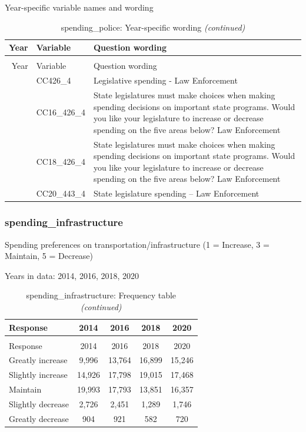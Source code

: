 \documentclass[
  12pt]{article}
\begin{document}
Year-specific variable names and
wording\begingroup\fontsize{11}{13}\selectfont

\begin{longtable}[t]{rl>{\raggedright\arraybackslash}p{10cm}}
\caption{\label{tab:unnamed-chunk-5}spending\_police: Year-specific wording}\\
\toprule
Year & Variable & Question wording\\
\midrule
\endfirsthead
\caption[]{spending\_police: Year-specific wording \textit{(continued)}}\\
\toprule
Year & Variable & Question wording\\
\midrule
\endhead

\endfoot
\bottomrule
\endlastfoot
2014 & CC426\_4 & Legislative spending - Law Enforcement\\
\addlinespace
2016 & CC16\_426\_4 & State legislatures must make choices when making spending decisions on important state programs. Would you like your legislature to increase or decrease spending on the five areas below? Law Enforcement\\
\addlinespace
2018 & CC18\_426\_4 & State legislatures must make choices when making spending decisions on important state programs. Would you like your legislature to increase or decrease spending on the five areas below? Law Enforcement\\
\addlinespace
2020 & CC20\_443\_4 & State legislature spending -- Law Enforcement\\*
\end{longtable}
\endgroup{}

\hypertarget{spending_infrastructure}{%
\subsubsection{spending\_infrastructure}\label{spending_infrastructure}}

Spending preferences on transportation/infrastructure (1 = Increase, 3 =
Maintain, 5 = Decrease)

Years in data: 2014, 2016, 2018,
2020\begingroup\fontsize{10}{12}\selectfont

\begin{longtable}[t]{lcccc}
\caption{\label{tab:unnamed-chunk-5}spending\_infrastructure: Frequency table}\\
\toprule
Response & 2014 & 2016 & 2018 & 2020\\
\midrule
\endfirsthead
\caption[]{spending\_infrastructure: Frequency table \textit{(continued)}}\\
\toprule
Response & 2014 & 2016 & 2018 & 2020\\
\midrule
\endhead

\endfoot
\bottomrule
\endlastfoot
Greatly increase & 9,996 & 13,764 & 16,899 & 15,246\\
Slightly increase & 14,926 & 17,798 & 19,015 & 17,468\\
Maintain & 19,993 & 17,793 & 13,851 & 16,357\\
Slightly decrease & 2,726 & 2,451 & 1,289 & 1,746\\
Greatly decrease & 904 & 921 & 582 & 720\\*
\end{longtable}
\endgroup{}
\end{document}
